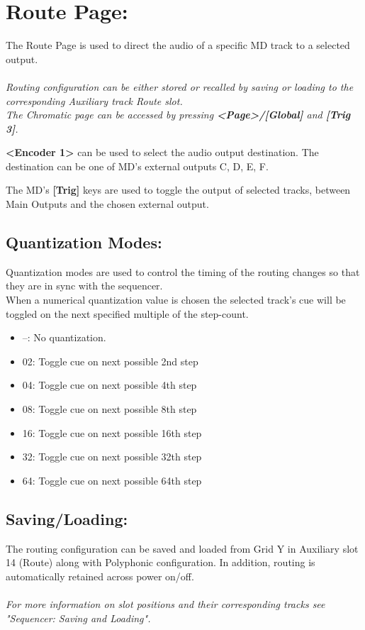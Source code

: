  \chapter{Route Page:}
 The Route Page is used to direct the audio of a specific MD track to a selected output.\\\\\textit{Routing configuration can be either stored or recalled by saving or loading to the corresponding Auxiliary track Route slot.} \\
 
\textit{The Chromatic page can be accessed by pressing \textbf{<Page>/[Global]} and \textbf{[Trig 3]}.}


\textbf{<Encoder 1>} can be used to select the audio output destination. The destination can be one of MD's external outputs C, D, E, F.

The MD's \textbf{[Trig]} keys are used to toggle the output of selected tracks, between Main Outputs and the chosen external output.

\newpage
\section{Quantization Modes:}
 Quantization modes are used to control the timing of the routing changes so that they are in sync with the sequencer.
 \\
 When a numerical quantization value is chosen the selected track’s cue will be toggled on the next specified multiple of the step-count.
 \begin{itemize}
\item --: No quantization.
\item 02: Toggle cue on next possible 2nd step
\item 04: Toggle cue on next possible 4th step
\item 08: Toggle cue on next possible 8th step 
\item 16: Toggle cue on next possible 16th step 
\item 32: Toggle cue on next possible 32th step 
\item 64: Toggle cue on next possible 64th step
 \end{itemize}
 
 \section{Saving/Loading:}
The routing configuration can be saved and loaded from Grid Y in Auxiliary slot 14 (Route) along with Polyphonic configuration. In addition, routing is automatically retained across power on/off.\\\\
\textit{For more information on slot positions and their corresponding tracks see  "Sequencer: Saving and Loading".}

 
 